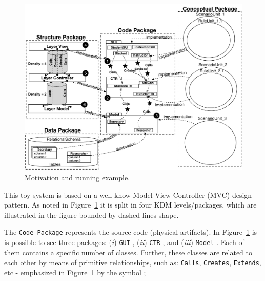 \begin{figure}
	\centering
	\includegraphics[scale=0.58]{figuras/NewSystemVersion}
	\caption{Motivation and running example.}
	\label{fig:system}
\end{figure}
 
This toy system is based on a well know Model View Controller (MVC) design pattern. As noted in Figure~\ref{fig:system} it is split in four KDM levels/packages, which are illustrated in the figure bounded by dashed lines shape. %

The \texttt{Code Package} represents the source-code (physical artifacts). In Figure~\ref{fig:system} is is possible to see three packages: (\textit{i}) \texttt{GUI} , (\textit{ii}) \texttt{CTR} , and (\textit{iii}) \texttt{Model} . Each of them contains a specific number of classes. %
Further, these classes are related to each other by means of primitive relationships, such as: \texttt{Calls}, \texttt{Creates}, \texttt{Extends}, etc -  emphasized in Figure~\ref{fig:system} by the symbol ;

